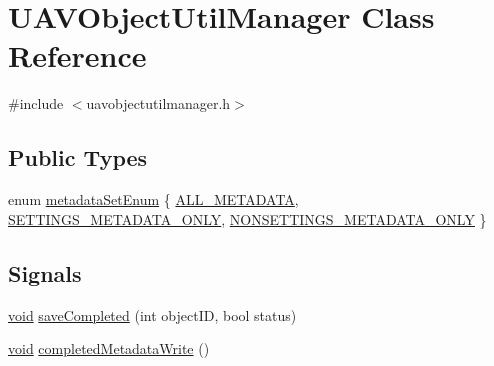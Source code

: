 \hypertarget{class_u_a_v_object_util_manager}{\section{\-U\-A\-V\-Object\-Util\-Manager \-Class \-Reference}
\label{class_u_a_v_object_util_manager}
}


{\ttfamily \#include $<$uavobjectutilmanager.\-h$>$}

\subsection*{\-Public \-Types}
\begin{DoxyCompactItemize}
\item 
enum \hyperlink{group___u_a_v_objects_plugin_ga3f0971e47d6ebe87f97939435cd03da3}{metadata\-Set\-Enum} \{ \hyperlink{group___u_a_v_objects_plugin_gga3f0971e47d6ebe87f97939435cd03da3ac18452db1ea15afd4d64e97a407429cd}{\-A\-L\-L\-\_\-\-M\-E\-T\-A\-D\-A\-T\-A}, 
\hyperlink{group___u_a_v_objects_plugin_gga3f0971e47d6ebe87f97939435cd03da3a80d58d5e87824282131d8df8b346cf46}{\-S\-E\-T\-T\-I\-N\-G\-S\-\_\-\-M\-E\-T\-A\-D\-A\-T\-A\-\_\-\-O\-N\-L\-Y}, 
\hyperlink{group___u_a_v_objects_plugin_gga3f0971e47d6ebe87f97939435cd03da3a2629c57c3e595b842a552395cedd97c9}{\-N\-O\-N\-S\-E\-T\-T\-I\-N\-G\-S\-\_\-\-M\-E\-T\-A\-D\-A\-T\-A\-\_\-\-O\-N\-L\-Y}
 \}
\end{DoxyCompactItemize}
\subsection*{\-Signals}
\begin{DoxyCompactItemize}
\item 
\hyperlink{group___u_a_v_objects_plugin_ga444cf2ff3f0ecbe028adce838d373f5c}{void} \hyperlink{group___u_a_v_objects_plugin_ga34993cd463a734315dd04903a4e2de24}{save\-Completed} (int object\-I\-D, bool status)
\item 
\hyperlink{group___u_a_v_objects_plugin_ga444cf2ff3f0ecbe028adce838d373f5c}{void} \hyperlink{group___u_a_v_objects_plugin_gaf343ab5f4e4710c85cd7977ae7563ca1}{completed\-Metadata\-Write} ()
\end{DoxyCompactItemize}
